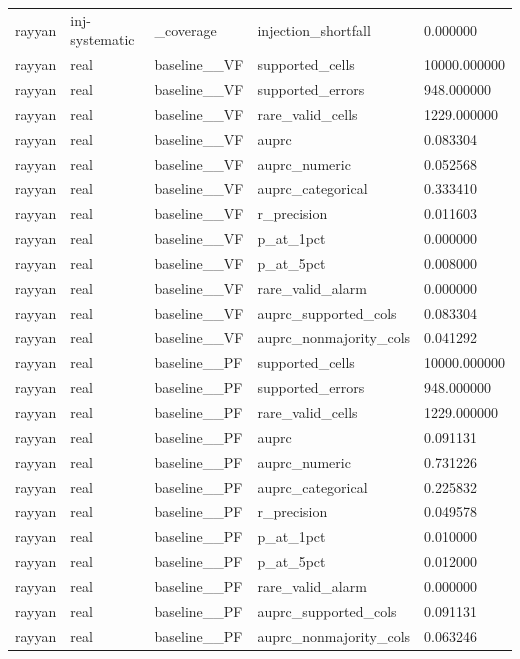 \begin{tabular}{lllll}
rayyan & inj-systematic & \_coverage & injection\_shortfall & 0.000000 \\
rayyan & real & baseline\_\_VF & supported\_cells & 10000.000000 \\
rayyan & real & baseline\_\_VF & supported\_errors & 948.000000 \\
rayyan & real & baseline\_\_VF & rare\_valid\_cells & 1229.000000 \\
rayyan & real & baseline\_\_VF & auprc & 0.083304 \\
rayyan & real & baseline\_\_VF & auprc\_numeric & 0.052568 \\
rayyan & real & baseline\_\_VF & auprc\_categorical & 0.333410 \\
rayyan & real & baseline\_\_VF & r\_precision & 0.011603 \\
rayyan & real & baseline\_\_VF & p\_at\_1pct & 0.000000 \\
rayyan & real & baseline\_\_VF & p\_at\_5pct & 0.008000 \\
rayyan & real & baseline\_\_VF & rare\_valid\_alarm & 0.000000 \\
rayyan & real & baseline\_\_VF & auprc\_supported\_cols & 0.083304 \\
rayyan & real & baseline\_\_VF & auprc\_nonmajority\_cols & 0.041292 \\
rayyan & real & baseline\_\_PF & supported\_cells & 10000.000000 \\
rayyan & real & baseline\_\_PF & supported\_errors & 948.000000 \\
rayyan & real & baseline\_\_PF & rare\_valid\_cells & 1229.000000 \\
rayyan & real & baseline\_\_PF & auprc & 0.091131 \\
rayyan & real & baseline\_\_PF & auprc\_numeric & 0.731226 \\
rayyan & real & baseline\_\_PF & auprc\_categorical & 0.225832 \\
rayyan & real & baseline\_\_PF & r\_precision & 0.049578 \\
rayyan & real & baseline\_\_PF & p\_at\_1pct & 0.010000 \\
rayyan & real & baseline\_\_PF & p\_at\_5pct & 0.012000 \\
rayyan & real & baseline\_\_PF & rare\_valid\_alarm & 0.000000 \\
rayyan & real & baseline\_\_PF & auprc\_supported\_cols & 0.091131 \\
rayyan & real & baseline\_\_PF & auprc\_nonmajority\_cols & 0.063246 \\

\end{tabular}
